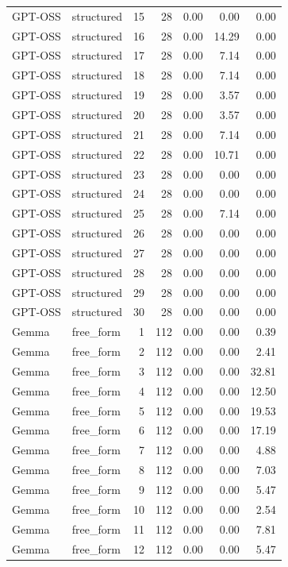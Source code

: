 \begin{longtable}{llrrrrr}
GPT-OSS & structured & 15 & 28 & 0.00 & 0.00 & 0.00 \\
GPT-OSS & structured & 16 & 28 & 0.00 & 14.29 & 0.00 \\
GPT-OSS & structured & 17 & 28 & 0.00 & 7.14 & 0.00 \\
GPT-OSS & structured & 18 & 28 & 0.00 & 7.14 & 0.00 \\
GPT-OSS & structured & 19 & 28 & 0.00 & 3.57 & 0.00 \\
GPT-OSS & structured & 20 & 28 & 0.00 & 3.57 & 0.00 \\
GPT-OSS & structured & 21 & 28 & 0.00 & 7.14 & 0.00 \\
GPT-OSS & structured & 22 & 28 & 0.00 & 10.71 & 0.00 \\
GPT-OSS & structured & 23 & 28 & 0.00 & 0.00 & 0.00 \\
GPT-OSS & structured & 24 & 28 & 0.00 & 0.00 & 0.00 \\
GPT-OSS & structured & 25 & 28 & 0.00 & 7.14 & 0.00 \\
GPT-OSS & structured & 26 & 28 & 0.00 & 0.00 & 0.00 \\
GPT-OSS & structured & 27 & 28 & 0.00 & 0.00 & 0.00 \\
GPT-OSS & structured & 28 & 28 & 0.00 & 0.00 & 0.00 \\
GPT-OSS & structured & 29 & 28 & 0.00 & 0.00 & 0.00 \\
GPT-OSS & structured & 30 & 28 & 0.00 & 0.00 & 0.00 \\
Gemma & free\_form & 1 & 112 & 0.00 & 0.00 & 0.39 \\
Gemma & free\_form & 2 & 112 & 0.00 & 0.00 & 2.41 \\
Gemma & free\_form & 3 & 112 & 0.00 & 0.00 & 32.81 \\
Gemma & free\_form & 4 & 112 & 0.00 & 0.00 & 12.50 \\
Gemma & free\_form & 5 & 112 & 0.00 & 0.00 & 19.53 \\
Gemma & free\_form & 6 & 112 & 0.00 & 0.00 & 17.19 \\
Gemma & free\_form & 7 & 112 & 0.00 & 0.00 & 4.88 \\
Gemma & free\_form & 8 & 112 & 0.00 & 0.00 & 7.03 \\
Gemma & free\_form & 9 & 112 & 0.00 & 0.00 & 5.47 \\
Gemma & free\_form & 10 & 112 & 0.00 & 0.00 & 2.54 \\
Gemma & free\_form & 11 & 112 & 0.00 & 0.00 & 7.81 \\
Gemma & free\_form & 12 & 112 & 0.00 & 0.00 & 5.47 \\

\end{longtable}
